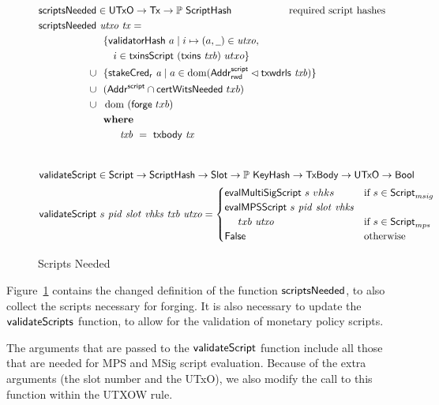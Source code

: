\begin{figure}[htb]
  \begin{align*}
    \fun{scriptsNeeded} & \in \UTxO \to \Tx \to \powerset{\ScriptHash} \hspace{2cm} \text{required script hashes} \\
    \fun{scriptsNeeded} &~\var{utxo}~\var{tx} = \\
    & ~~\{ \fun{validatorHash}~a \mid i \mapsto (a, \wcard) \in \var{utxo},\\
    & ~~~~~i\in\fun{txinsScript}~{(\fun{txins~\var{txb}})}~{utxo}\} \\
    \cup & ~~\{ \fun{stakeCred_{r}}~\var{a} \mid a \in \dom (\AddrRWDScr
           \restrictdom \fun{txwdrls}~\var{txb}) \} \\
      \cup & ~~(\AddrScr \cap \fun{certWitsNeeded}~{txb}) \\
      \cup & ~~\dom~(\fun{forge}~{txb}) \\
      & \where \\
    & ~~~~~~~ \var{txb}~=~\txbody{tx} \\
    \nextdef
      \fun{validateScript} & \in\Script\to\ScriptHash\to\Slot\to
      \powerset{\KeyHash}\to\TxBody\to\UTxO\to\Bool \\
      \fun{validateScript} & ~s~\var{pid}~\var{slot}~\var{vhks}
       ~\var{txb}~\var{utxo} =
                             \begin{cases}
                               \fun{evalMultiSigScript}~s~vhks & \text{if}~s \in\ScriptMSig \\
                               \fun{evalMPSScript}~s~\var{pid}~\var{slot}~\var{vhks} \\
                                ~~~~txb~\var{utxo} & \text{if}~s \in\ScriptMPS \\
                               \mathsf{False} & \text{otherwise}
                             \end{cases} \\
  \end{align*}
  \caption{Scripts Needed}
  \label{fig:functions-witnesses}
\end{figure}

Figure~\ref{fig:functions-witnesses} contains the changed definition
of the function $\mathsf{scriptsNeeded}$, to also collect the scripts
necessary for forging. It is also necessary to update the
$\mathsf{validateScripts}$ function, to allow for the validation of
monetary policy scripts.

The arguments that are passed to the $\mathsf{validateScript}$ function include all those
that are needed for MPS and MSig script evaluation. Because of the extra arguments
(the slot number and the UTxO), we also modify the call to this function
within the UTXOW rule.

